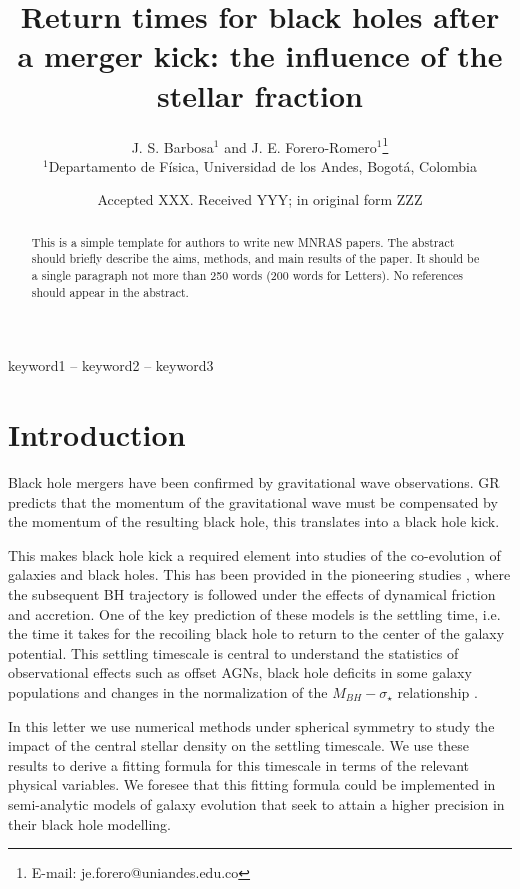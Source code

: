 \documentclass[fleqn,usenatbib]{mnras}
\title[Black Hole Return Times]{Return times for black holes after a merger kick: the influence of the stellar fraction}
\author[Barbosa and Forero-Romero]{
J. S. Barbosa$^{1}$ and 
J. E. Forero-Romero$^{1}$\thanks{E-mail: je.forero@uniandes.edu.co}
\\
$^{1}$Departamento de F\'isica, Universidad de los Andes, Bogot\'a, Colombia\\
}
\date{Accepted XXX. Received YYY; in original form ZZZ}
\begin{document}
\label{firstpage}
\pagerange{\pageref{firstpage}--\pageref{lastpage}}
\maketitle

\begin{abstract}
This is a simple template for authors to write new MNRAS papers.
The abstract should briefly describe the aims, methods, and main results of the paper.
It should be a single paragraph not more than 250 words (200 words for Letters).
No references should appear in the abstract.
\end{abstract}

\begin{keywords}
keyword1 -- keyword2 -- keyword3
\end{keywords}



\section{Introduction}

Black hole mergers have been confirmed by gravitational wave observations.
GR predicts that the momentum of the gravitational wave must be compensated
by the momentum of the resulting black hole, this translates into 
a black hole kick.

This makes black hole kick a required element into studies of the co-evolution of galaxies and black holes.
This has been provided in the pioneering studies 
\citep{2008ApJ...678..780G}, where the subsequent BH trajectory is followed under the effects of dynamical friction and accretion.
One of the key prediction of these models is the settling time, i.e. the time it takes for the recoiling black hole to return to the center of the galaxy potential. 
This settling timescale is central to understand the statistics of observational effects such as offset AGNs, black hole deficits in some galaxy populations and changes in the normalization of the $M_{BH}-\sigma_{\star}$ relationship \citep{2011MNRAS.412.2154B}.

In this letter we use numerical methods under spherical symmetry to study the impact of the central stellar density on the settling timescale.
We use these results to derive a fitting formula for this timescale in terms of the relevant physical variables.
We foresee that this fitting formula could be implemented in semi-analytic models of galaxy evolution that seek to attain a higher precision in their black hole modelling.
\end{document}
